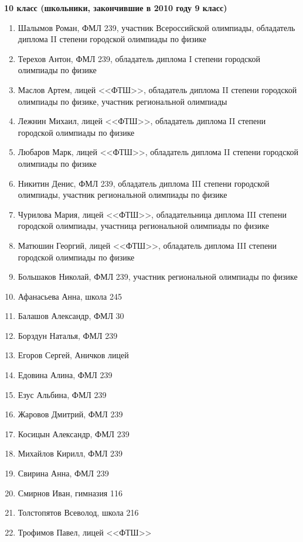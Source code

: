 \textbf{10 класс (школьники, закончившие в 2010 году 9 класс)}
\begin{enumerate}
\item Шалымов Роман, ФМЛ 239, участник Всероссийской олимпиады, обладатель диплома II степени городской олимпиады по физике
\item Терехов Антон, ФМЛ 239, обладатель диплома I степени городской олимпиады по физике
\item Маслов Артем, лицей <<ФТШ>>, обладатель диплома II степени городской олимпиады по физике, участник региональной олимпиады
\item Лежнин Михаил, лицей <<ФТШ>>, обладатель диплома II степени городской олимпиады по физике
\item Любаров Марк, лицей <<ФТШ>>, обладатель диплома II степени городской олимпиады по физике
\item Никитин Денис, ФМЛ 239, обладатель диплома III степени городской олимпиады, участник региональной олимпиады по физике
\item Чурилова Мария, лицей <<ФТШ>>, обладательница диплома III степени городской олимпиады, участница региональной олимпиады по физике
\item Матюшин Георгий, лицей <<ФТШ>>, обладатель диплома III степени городской олимпиады по физике
\item Большаков Николай, ФМЛ 239, участник региональной олимпиады по физике
\item Афанасьева Анна, школа 245
\item Балашов Александр, ФМЛ 30
\item Борздун Наталья, ФМЛ 239
\item Егоров Сергей, Аничков лицей
\item Едовина Алина, ФМЛ 239
\item Езус Альбина, ФМЛ 239
\item Жаровов Дмитрий, ФМЛ 239
\item Косицын Александр, ФМЛ 239
\item Михайлов Кирилл, ФМЛ 239
\item Свирина Анна, ФМЛ 239
\item Смирнов Иван, гимназия 116
\item Толстопятов Всеволод, школа 216
\item Трофимов Павел, лицей <<ФТШ>>
\end{enumerate}
